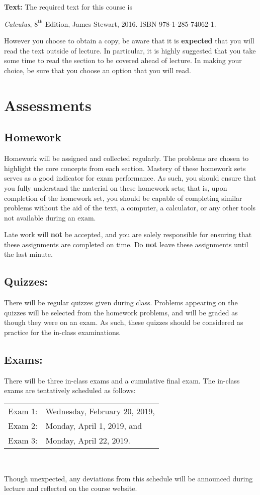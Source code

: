 \documentclass[12pt]{amsart}
\begin{document}
\noindent\textbf{Text:}
The required text for this course is
\begin{center}
  {\it Calculus}, $8^{\text{th}}$ Edition, James Stewart, 2016. ISBN 978-1-285-74062-1.
\end{center}

\noindent
However you choose to obtain a copy, be aware that it is {\bf expected} that you will read the text outside of lecture.
In particular, it is highly suggested that you take some time to read the section to be covered ahead of lecture.
In making your choice, be sure that you choose an option that you will read.

\section*{Assessments}
\subsection*{Homework}

\noindent
Homework will be assigned and collected regularly.
The problems are chosen to highlight the core concepts from each section.
Mastery of these homework sets serves as a good indicator for exam performance.
As such, you should ensure that you fully understand the material on these homework sets; that is, upon completion of the homework set, you should be capable of completing similar problems without the aid of the text, a computer, a calculator, or any other tools not available during an exam.

Late work will {\bf not} be accepted, and you are solely responsible for ensuring that these assignments are completed on time.
Do {\bf not} leave these assignments until the last minute.

\subsection*{Quizzes:}

\noindent
There will be regular quizzes given during class.
Problems appearing on the quizzes will be selected from the homework problems, and will be graded as though they were on an exam.
As such, these quizzes should be considered as practice for the in-class examinations.

\subsection*{Exams:}
\noindent There will be three in-class exams and a cumulative final exam.
The in-class exams are tentatively scheduled as follows:
\begin{center}
  \begin{tabular}{ll}
    Exam 1: & Wednesday, February 20, 2019,\\
    Exam 2: & Monday, April 1, 2019, and\\
    Exam 3: & Monday, April 22, 2019.\\
  \end{tabular}\\
\end{center}
Though unexpected, any deviations from this schedule will be announced during lecture and reflected on the course website.
\end{document}
